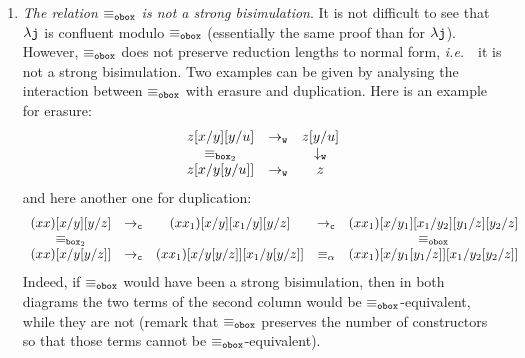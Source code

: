 \documentclass{LMCS}
\newcommand{\ie}{{\it  i.e.}~}
\renewcommand{\>}{\rightarrow}
\def\lam{\lambda}
\newcommand{\Rew}[1]{\rightarrow_{#1}}
\newcommand{\dis}{{\tt j}}
\newcommand{\ldis}{\lam{\dis}}
\newcommand{\DSubs}{{\tt c}}
\newcommand{\Gc}{{\tt w}}
\newcommand{\eqw}[1]{\equiv_{#1}}
\newcommand{\fsymb}{\osymb\boite}
\newcommand{\osymb}{{\tt o}}
\newcommand{\eqf}{\eqw{\fsymb}}
\newcommand{\boite}{{\tt box}}
\newcommand{\sigq}{\boite_2}
\begin{document}
\begin{enumerate}[$\bullet$]
\item \textit{The relation $\eqf$ is not a strong bisimulation}.  It
  is not difficult to see that $\ldis$ is confluent modulo $\eqf$
  (essentially the same proof than for $\ldis$). However, $\eqf$ does
  not preserve reduction lengths to normal form, \ie\  it is not a
  strong bisimulation. Two  examples can be given by analysing the
  interaction  between $\eqf$ with erasure and duplication. 
  Here is an example for erasure:  
\[ \begin{array}{cccccccccc}
z[x/y][y/u]& \Rew{\Gc}&z[y/u]\\
\eqw{\sigq}&&\downarrow_{\Gc}\\
z[x/y[y/u]]&\Rew{\Gc}& z
   \end{array} \]   
and here another  one for duplication:
\[ \begin{array}{cccccccccc}
(x x)[x/y][y/z]& \Rew{\DSubs}&(x x_1)[x/y][x_1/y][y/z]&\Rew{\DSubs}&(x x_1)[x/y_1][x_1/y_2][y_1/z][y_2/z]\\
\eqw{\sigq}&&&&\eqf\\
(x x)[x/y[y/z]]&\Rew{\DSubs}& (x x_1)[x/y[y/z]][x_1/y[y/z]]&\eqw{\alpha}&(x x_1)[x/y_1[y_1/z]][x_1/y_2[y_2/z]]
   \end{array} \]      
Indeed, if $\eqf$ would have been a strong bisimulation, then in both diagrams
the two terms of the second column would be $\eqf$-equivalent, while
they are not (remark that $\eqf$ preserves the number of constructors
so that those terms cannot be $\eqf$-equivalent).



\end{enumerate}
\end{document}
